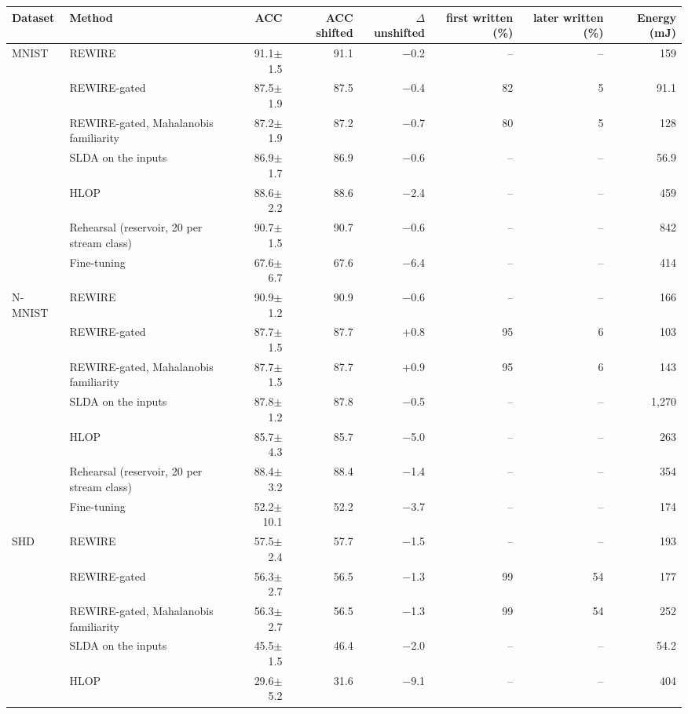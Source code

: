 \begin{tabular*}{\textwidth}{@{\extracolsep{\fill}}llrrrrrr@{}}
\toprule
Dataset & Method & ACC & ACC shifted & $\Delta$ unshifted & first written (\%) & later written (\%) & Energy (mJ) \\
\midrule
MNIST & REWIRE & 91.1$\pm$1.5 & 91.1 & \ensuremath{-}0.2 & -- & -- & 159 \\
 & REWIRE-gated & 87.5$\pm$1.9 & 87.5 & \ensuremath{-}0.4 & 82 & 5 & 91.1 \\
 & REWIRE-gated, Mahalanobis familiarity & 87.2$\pm$1.9 & 87.2 & \ensuremath{-}0.7 & 80 & 5 & 128 \\
 & SLDA on the inputs & 86.9$\pm$1.7 & 86.9 & \ensuremath{-}0.6 & -- & -- & 56.9 \\
 & HLOP & 88.6$\pm$2.2 & 88.6 & \ensuremath{-}2.4 & -- & -- & 459 \\
 & Rehearsal (reservoir, 20 per stream class) & 90.7$\pm$1.5 & 90.7 & \ensuremath{-}0.6 & -- & -- & 842 \\
 & Fine-tuning & 67.6$\pm$6.7 & 67.6 & \ensuremath{-}6.4 & -- & -- & 414 \\
N-MNIST & REWIRE & 90.9$\pm$1.2 & 90.9 & \ensuremath{-}0.6 & -- & -- & 166 \\
 & REWIRE-gated & 87.7$\pm$1.5 & 87.7 & +0.8 & 95 & 6 & 103 \\
 & REWIRE-gated, Mahalanobis familiarity & 87.7$\pm$1.5 & 87.7 & +0.9 & 95 & 6 & 143 \\
 & SLDA on the inputs & 87.8$\pm$1.2 & 87.8 & \ensuremath{-}0.5 & -- & -- & 1,270 \\
 & HLOP & 85.7$\pm$4.3 & 85.7 & \ensuremath{-}5.0 & -- & -- & 263 \\
 & Rehearsal (reservoir, 20 per stream class) & 88.4$\pm$3.2 & 88.4 & \ensuremath{-}1.4 & -- & -- & 354 \\
 & Fine-tuning & 52.2$\pm$10.1 & 52.2 & \ensuremath{-}3.7 & -- & -- & 174 \\
SHD & REWIRE & 57.5$\pm$2.4 & 57.7 & \ensuremath{-}1.5 & -- & -- & 193 \\
 & REWIRE-gated & 56.3$\pm$2.7 & 56.5 & \ensuremath{-}1.3 & 99 & 54 & 177 \\
 & REWIRE-gated, Mahalanobis familiarity & 56.3$\pm$2.7 & 56.5 & \ensuremath{-}1.3 & 99 & 54 & 252 \\
 & SLDA on the inputs & 45.5$\pm$1.5 & 46.4 & \ensuremath{-}2.0 & -- & -- & 54.2 \\
 & HLOP & 29.6$\pm$5.2 & 31.6 & \ensuremath{-}9.1 & -- & -- & 404 \\

\end{tabular*}
